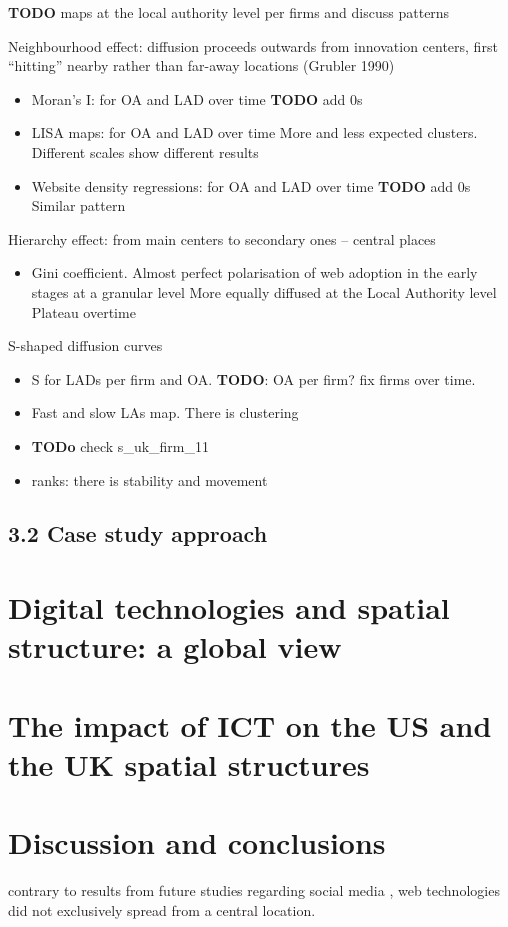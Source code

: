 \documentclass[
  authoryear,
  preprint,
  3p]{elsarticle}
\providecommand{\tightlist}{%
  \setlength{\itemsep}{0pt}\setlength{\parskip}{0pt}}\usepackage{longtable,booktabs,array}
\begin{document}
\textbf{TODO} maps at the local authority level per firms and discuss
patterns

Neighbourhood effect: diffusion proceeds outwards from innovation
centers, first ``hitting'' nearby rather than far-away locations
(Grubler 1990)

\begin{itemize}
\item
  Moran's I: for OA and LAD over time \textbf{TODO} add 0s
\item
  LISA maps: for OA and LAD over time More and less expected clusters.
  Different scales show different results
\item
  Website density regressions: for OA and LAD over time \textbf{TODO}
  add 0s Similar pattern
\end{itemize}

Hierarchy effect: from main centers to secondary ones -- central places

\begin{itemize}
\tightlist
\item
  Gini coefficient. Almost perfect polarisation of web adoption in the
  early stages at a granular level More equally diffused at the Local
  Authority level Plateau overtime
\end{itemize}

S-shaped diffusion curves

\begin{itemize}
\item
  S for LADs per firm and OA. \textbf{TODO}: OA per firm? fix firms over
  time.
\item
  Fast and slow LAs map. There is clustering
\item
  \textbf{TODo} check s\_uk\_firm\_11
\item
  ranks: there is stability and movement
\end{itemize}

\hypertarget{sec3.2}{%
\subsection{3.2 Case study approach}\label{sec3.2}}

\hypertarget{sec4}{%
\section{Digital technologies and spatial structure: a global
view}\label{sec4}}

\hypertarget{sec5}{%
\section{The impact of ICT on the US and the UK spatial
structures}\label{sec5}}

\hypertarget{sec6}{%
\section{Discussion and conclusions}\label{sec6}}

contrary to results from future studies regarding social media
\citep{lengyel2020role}, web technologies did not exclusively spread
from a central location.


\renewcommand\refname{References}
  
\end{document}
